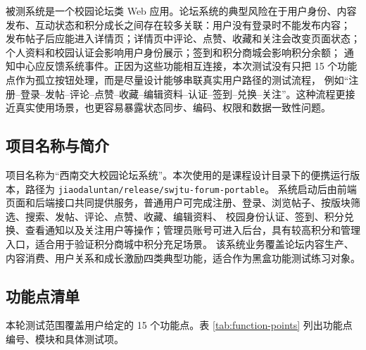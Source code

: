 \documentclass[bwprint]{report}
\begin{document}
被测系统是一个校园论坛类 Web 应用。论坛系统的典型风险在于用户身份、内容发布、互动状态和积分成长之间存在较多关联：用户没有登录时不能发布内容；
发布帖子后应能进入详情页；详情页中评论、点赞、收藏和关注会改变页面状态；个人资料和校园认证会影响用户身份展示；签到和积分商城会影响积分余额；
通知中心应反馈系统事件。正因为这些功能相互连接，本次测试没有只把 15 个功能点作为孤立按钮处理，而是尽量设计能够串联真实用户路径的测试流程，
例如“注册--登录--发帖--评论--点赞--收藏--编辑资料--认证--签到--兑换--关注”。这种流程更接近真实使用场景，也更容易暴露状态同步、编码、权限和数据一致性问题。

\subsection{项目名称与简介}
项目名称为“西南交大校园论坛系统”。本次使用的是课程设计目录下的便携运行版本，路径为 \texttt{jiaodaluntan/release/swjtu-forum-portable}。
系统启动后由前端页面和后端接口共同提供服务，普通用户可完成注册、登录、浏览帖子、按版块筛选、搜索、发帖、评论、点赞、收藏、编辑资料、
校园身份认证、签到、积分兑换、查看通知以及关注用户等操作；管理员账号可进入后台，具有较高积分和管理入口，适合用于验证积分商城中积分充足场景。
该系统业务覆盖论坛内容生产、内容消费、用户关系和成长激励四类典型功能，适合作为黑盒功能测试练习对象。

\subsection{功能点清单}
本轮测试范围覆盖用户给定的 15 个功能点。表 \ref{tab:function-points} 列出功能点编号、模块和具体测试项。
\end{document}
